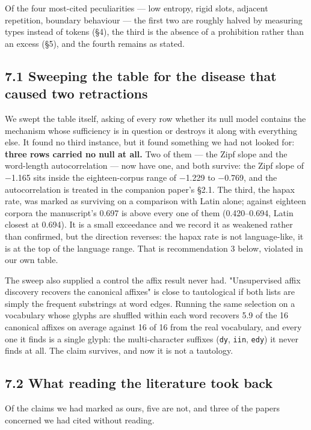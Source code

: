 \documentclass[11pt,a4paper]{article}
\begin{document}
Of the four most-cited peculiarities --- low entropy, rigid slots, adjacent repetition, boundary behaviour --- the first two are roughly halved by measuring types instead of tokens (\S4), the third is the absence of a prohibition rather than an excess (\S5), and the fourth remains as stated.


\subsection*{7.1 Sweeping the table for the disease that caused two retractions}


We swept the table itself, asking of every row whether its null model contains the mechanism whose sufficiency is in question or destroys it along with everything else. It found no third instance, but it found something we had not looked for: \textbf{three rows carried no null at all.} Two of them --- the Zipf slope and the word-length autocorrelation --- now have one, and both survive: the Zipf slope of $-$1.165 sits inside the eighteen-corpus range of $-$1.229 to $-$0.769, and the autocorrelation is treated in the companion paper's \S2.1. The third, the hapax rate, was marked as surviving on a comparison with Latin alone; against eighteen corpora the manuscript's 0.697 is above every one of them (0.420--0.694, Latin closest at 0.694). It is a small exceedance and we record it as weakened rather than confirmed, but the direction reverses: the hapax rate is not language-like, it is at the top of the language range. That is recommendation 3 below, violated in our own table.


The sweep also supplied a control the affix result never had. "Unsupervised affix discovery recovers the canonical affixes" is close to tautological if both lists are simply the frequent substrings at word edges. Running the same selection on a vocabulary whose glyphs are shuffled within each word recovers 5.9 of the 16 canonical affixes on average against 16 of 16 from the real vocabulary, and every one it finds is a single glyph: the multi-character suffixes (\texttt{dy}, \texttt{iin}, \texttt{edy}) it never finds at all. The claim survives, and now it is not a tautology.


\subsection*{7.2 What reading the literature took back}


Of the claims we had marked as ours, five are not, and three of the papers concerned we had cited without reading.
\end{document}
